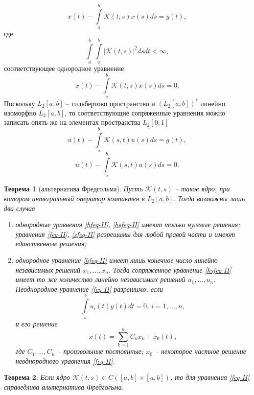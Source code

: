 \documentclass[a4paper, 12pt]{report}
\numberwithin{equation}{section}
\newtheorem*{theorem}{Теорема}
\begin{document}
	\begin{equation}
		x(t) - \int\limits_a^b \mathcal K(t,s)x(s)ds = y(t),
	\end{equation}
	где 
	\begin{equation*}
		\label{feq-II}
		\int\limits_a^b \int\limits_a^b | \mathcal K(t,s)|^2ds dt < \infty,
	\end{equation*}
	соответствующее однородное уравнение
	\begin{equation}
		\label{hfeq-II}
		x(t) - \int\limits_a^b \mathcal K(t,s)x(s)ds = 0.
	\end{equation}
	Поскольку $L_2[a,b]$ -- гильбертово пространство и $(L_2[a,b])^*$ линейно изоморфно $L_2[a,b]$, то соответствующие сопряженные уравнения можно записать опять же на элементах пространства $L_2[0,1]$
	\begin{equation}
		\label{sfeq-II}
		u(t) - \int\limits_a^b \mathcal K(s,t)u(s)ds = g(t),
	\end{equation}
	\begin{equation}
		\label{hsfeq-II}
		u(t) - \int\limits_a^b \mathcal K(s,t)u(s)ds = 0.
	\end{equation}
	\begin{theorem}
		[альтернатива Фредгольма]
		Пусть $\mathcal K(t,s)$ -- такое ядро, при котором интегральный оператор компактен в $L_2[a,b]$. Тогда возможны лишь два случая
		\begin{enumerate}
			\item однородные уравнения \eqref{hfeq-II}, \eqref{hsfeq-II} имеют только нулевые решения; уравнения \eqref{feq-II}, \eqref{sfeq-II} разрешимы для любой правой части и имеют единственные решения;
			\item однородное уравнение \eqref{hfeq-II} имеет лишь конечное число линейно независимых решений $x_1,\ldots, x_n$. Тогда сопряженное уравнение \eqref{hsfeq-II} имеет то же количество линейно независимых решений $u_1,\ldots, u_n$. Неоднородное уравнение \eqref{feq-II} разрешимо, если 
			\begin{equation*}
				\int\limits_a^b u_i(t) y(t)dt = 0,\ i = 1,\ldots, n,
			\end{equation*}
			 и его решение
			 \begin{equation*}
			 	x(t) = \sum_{k=1}^{n}C_k x_k + x_0(t),
			 \end{equation*}
			 где $C_1,\ldots, C_n$ -- произвольные постоянные; $x_0$ -- некоторое частное решение неоднородного уравнения \eqref{feq-II}.
		\end{enumerate}
	\end{theorem}
	\begin{theorem}
		Если ядро $\mathcal K(t,s) \in C([a,b]\times [a,b])$, то для уравнения \eqref{feq-II} справедлива альтернатива Фредгольма.
	\end{theorem}
\end{document}
